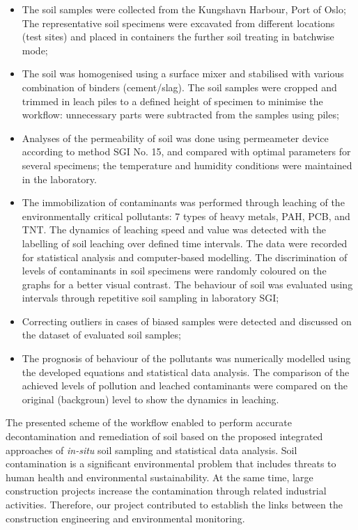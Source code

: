 \documentclass[algorithms,article,submit,pdftex,moreauthors]{Definitions/mdpi}
\begin{document}
\begin{itemize}
	\item The soil samples were collected from the Kungshavn Harbour, Port of Oslo; The representative soil specimens were excavated from different locations (test sites) and placed in containers the further soil treating in batchwise mode; 
	\item The soil was homogenised using a surface mixer and stabilised with various combination of binders (cement/slag). The soil samples were cropped and trimmed in leach piles to a defined height of specimen to minimise the workflow: unnecessary parts were subtracted from the samples using piles; 
	\item Analyses of the permeability of soil was done using permeameter device according to method SGI No. 15, and compared with optimal parameters for several specimens; the temperature and humidity conditions were maintained in the laboratory.
	\item The immobilization of contaminants was performed through leaching of the environmentally critical pollutants: 7 types of heavy metals, PAH, PCB, and TNT. The dynamics of leaching speed and value was detected with the labelling of soil leaching over defined time intervals. The data were recorded for statistical analysis and computer-based modelling. The discrimination of levels of contaminants in soil specimens were randomly coloured on the graphs for a better visual contrast. The behaviour of soil was evaluated using intervals through repetitive soil sampling in laboratory SGI; 
	\item Correcting outliers in cases of biased samples were detected and discussed on the dataset of evaluated soil samples; 
	\item The prognosis of behaviour of the pollutants was numerically modelled using the developed equations and statistical data analysis. The comparison of the achieved levels of pollution and leached contaminants were compared on the original (backgroun) level to show the dynamics in leaching.  
\end{itemize}

The presented scheme of the workflow enabled to perform accurate decontamination and remediation of soil based on the proposed integrated approaches of \emph{in-situ} soil sampling and statistical data analysis. Soil contamination is a significant environmental problem that includes  threats to human health and environmental sustainability. At the same time, large construction projects increase the contamination through related industrial activities. Therefore, our project contributed to establish the links between the construction engineering and environmental monitoring.
\end{document}
